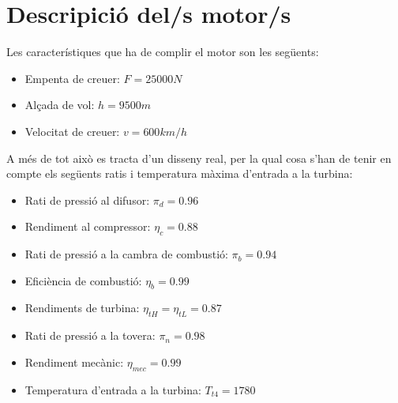 \section{Descripició del/s motor/s}
Les característiques que ha de complir el motor son les següents:
\begin{itemize}
\item Empenta de creuer: $F=25000N$
\item Alçada de vol: $h=9500m$
\item Velocitat de creuer: $v=600km/h$
\end{itemize}
A més de tot això es tracta d'un disseny real, per la qual cosa s'han de tenir en compte els següents ratis i temperatura màxima d'entrada a la turbina:
\begin{itemize}
\item Rati de pressió al difusor: $\pi_d=0.96$
\item Rendiment al compressor: $\eta_c=0.88$
\item Rati de pressió a la cambra de combustió: $\pi_b=0.94$
\item Eficiència de combustió: $\eta_b=0.99$
\item Rendiments de turbina: $\eta_{tH}=\eta_{tL}=0.87$
\item Rati de pressió a la tovera: $\pi_n=0.98$
\item Rendiment mecànic: $\eta_{mec}=0.99$
\item Temperatura d'entrada a la turbina: $T_{t4}=1780$
\end{itemize}
